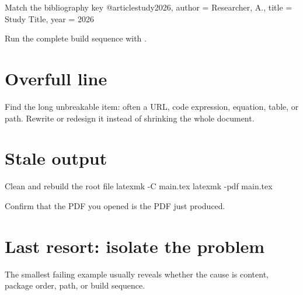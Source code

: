 \begin{latexcode}{Match the bibliography key}
@article{study2026,
  author = {Researcher, A.},
  title  = {Study Title},
  year   = {2026}
}

\parencite{study2026}
\end{latexcode}

Run the complete build sequence with .

\section{Overfull line}

Find the long unbreakable item: often a URL, code expression, equation, table,
or path. Rewrite or redesign it instead of shrinking the whole document.

\section{Stale output}

\begin{terminalcode}{Clean and rebuild the root file}
latexmk -C main.tex
latexmk -pdf main.tex
\end{terminalcode}

Confirm that the PDF you opened is the PDF just produced.

\section{Last resort: isolate the problem}


The smallest failing example usually reveals whether the cause is content,
package order, path, or build sequence.
